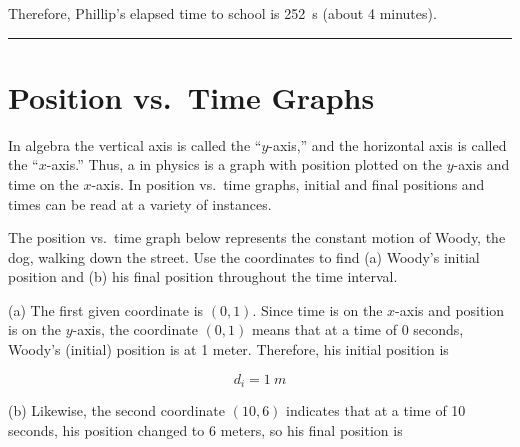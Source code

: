 \documentclass{article}
\begin{document}
Therefore, Phillip's elapsed time to school is \SI{252}{s} (about 4 minutes).

\hrule


\section{Position vs.~Time Graphs} \label{qoPhdL}

In algebra the vertical axis is called the ``$y$-axis,'' and the horizontal axis is called the ``$x$-axis.'' Thus, a  in physics is a graph with position plotted on the $y$-axis and time on the $x$-axis. In position vs.~time graphs, initial and final positions and times can be read at a variety of instances.


\begin{example} \label{jS4CBO}
    The position vs.~time graph below represents the constant motion of Woody, the dog, walking down the street. Use the coordinates to find (a) Woody's initial position and (b) his final position throughout the time interval.
\end{example}

\begin{center}
\captionsetup{type=figure,margin=1in}
\label{Ujz7ke}
\end{center}

 (a) The first given coordinate is $(0,1)$. Since time is on the $x$-axis and position is on the $y$-axis, the coordinate $(0,1)$ means that at a time of 0 seconds, Woody's (initial) position is at 1 meter. Therefore, his initial position is 

\begin{equation*}
    d_i = \SI{1}{m}
\end{equation*}

(b) Likewise, the second coordinate $(10,6)$ indicates that at a time of 10 seconds, his position changed to 6 meters, so his final position is
\end{document}
